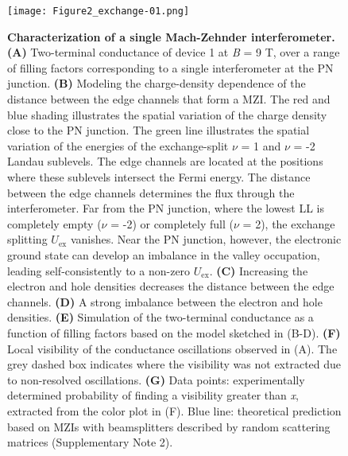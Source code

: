 \documentclass[%
reprint,amsmath,amssymb,aps,prl,superscriptaddress,
twocolumn
]{revtex4-1}
\begin{document}
			\begin{figure}
				\texttt{[image: Figure2\_exchange-01.png]}%
				\caption{\textbf{Characterization of a single Mach-Zehnder interferometer.} \textbf{(A)} Two-terminal conductance of device 1 at  \emph{B} = 9 T, over a range of filling factors corresponding to a single interferometer at the PN junction. \textbf{(B)} Modeling the charge-density dependence of the distance between the edge channels that form a MZI. The red and blue shading illustrates the spatial variation of the charge density close to the PN junction. The green line illustrates the spatial variation of the energies of the exchange-split $\nu$ = 1 and $\nu$ = -2 Landau sublevels. The edge channels are located at the positions where these sublevels intersect the Fermi energy. The distance between the edge channels determines the flux through the interferometer. Far from the PN junction, where the lowest LL is completely empty ($\nu$ = -2) or completely full ($\nu$ = 2), the exchange splitting $U_\mathrm{ex}$ vanishes. Near the PN junction, however, the electronic ground state can develop an imbalance in the valley occupation, leading self-consistently to a non-zero $U_\mathrm{ex}$. \textbf{(C)} Increasing the electron and hole densities decreases the distance between the edge channels. \textbf{(D)} A strong imbalance between the electron and hole densities. \textbf{(E)} Simulation of the two-terminal conductance as a function of filling factors based on the model sketched in (B-D). \textbf{(F)} Local visibility of the conductance oscillations observed in (A). The grey dashed box indicates where the visibility was not extracted due to non-resolved oscillations. \textbf{(G)} Data points: experimentally determined probability of finding a visibility greater than  \emph{x}, extracted from the color plot in (F). Blue line: theoretical prediction based on MZIs with beamsplitters described by random scattering matrices (Supplementary Note 2).}
				\label{fig:F2}
			\end{figure}
			
\end{document}
